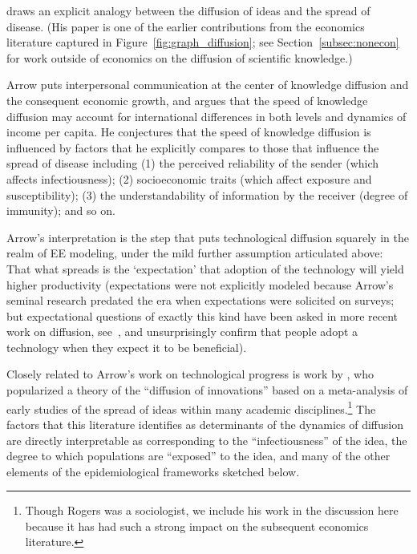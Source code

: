 \href{https://github.com/iworld1991/EpiExp/blob/master/Literature/arrow_classificatory_1969.pdf}{\cite{arrow_classificatory_1969}} draws an explicit analogy between the diffusion of ideas and the spread of disease.  (His paper is one of the earlier contributions from the economics literature captured in Figure~\ref{fig:graph_diffusion}; see Section~\ref{subsec:nonecon} for work outside of economics on the diffusion of scientific knowledge.)

Arrow puts interpersonal communication at the center of knowledge diffusion and the consequent economic growth, and argues that the speed of knowledge diffusion may account for international differences in both levels and dynamics of income per capita. He conjectures that the speed of knowledge diffusion is influenced by factors that he explicitly compares to  those that influence the spread of disease including (1) the perceived reliability of the sender (which affects infectiousness); (2) socioeconomic traits (which affect exposure and susceptibility); (3) the understandability of information by the receiver (degree of immunity); and so on.

Arrow's interpretation is the step that puts technological diffusion squarely in the realm of EE modeling, under the mild further assumption articulated above: That what spreads is the `expectation' that adoption of the technology will yield higher productivity (expectations were not explicitly modeled because Arrow's seminal research predated the era when expectations were solicited on surveys; but expectational questions of exactly this kind have been asked in more recent work on diffusion, see~\cite{banerjee2013diffusion}, and unsurprisingly confirm that people adopt a technology when they expect it to be beneficial).

Closely related to Arrow's work on technological progress is work by \href{https://en.wikipedia.org/wiki/Diffusion_of_innovations}{\cite{rogers1962diffusion}}, who popularized a theory of the ``diffusion of innovations'' based on a meta-analysis of early studies of the spread of ideas within many academic disciplines.\footnote{Though Rogers was a sociologist, we include his work in the discussion here because it has had such a strong impact on the subsequent economics literature.}  The factors that this literature identifies as determinants of the dynamics of diffusion are directly interpretable as corresponding to the ``infectiousness'' of the idea, the degree to which populations are ``exposed'' to the idea, and many of the other elements of the epidemiological frameworks sketched below.

